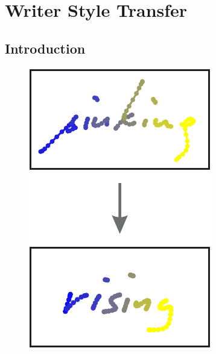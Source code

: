 \chapter{Writer Style Transfer}\label{chapter:writerStyleTransfer}

\section{Introduction}

\begin{figure}
  \vspace{-15pt}
  \raggedleft
  \begin{minipage}{0.20\textwidth}
    \centering
    \includegraphics[width=\textwidth]{../assets/showcase/style_transfer.pdf}
    \caption[Writer style transfer]{}
    \vspace{-45pt}
    \label{fig:writerStyleTransfer}
  \end{minipage}%
\end{figure}

